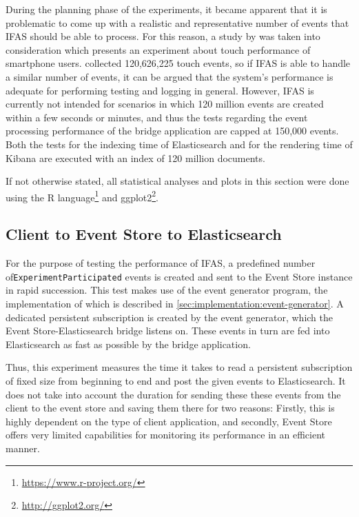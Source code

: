 During the planning phase of the experiments, it became apparent that it is problematic to come up with a realistic and representative number of events that \ac{IFAS} should be able to process.
For this reason, a study by \citet{Henze2011} was taken into consideration which presents an experiment about touch performance of smartphone users.
\citeauthor{Henze2011} collected 120,626,225 touch events, so if \ac{IFAS} is able to handle a similar number of events, it can be argued that the system's performance is adequate for performing testing and logging in general.
However, \ac{IFAS} is currently not intended for scenarios in which 120 million events are created within a few seconds or minutes, and thus the tests regarding the event processing performance of the bridge application are capped at 150,000 events.
Both the tests for the indexing time of Elasticsearch and for the rendering time of Kibana are executed with an index of 120 million documents.

If not otherwise stated, all statistical analyses and plots in this section were done using the R language\footnote{\url{https://www.r-project.org/}} and ggplot2\footnote{\url{http://ggplot2.org/}}.

\subsection{Client to Event Store to Elasticsearch}
\label{subsec:evaluation:performance:evt-es-bridge}

For the purpose of testing the performance of \ac{IFAS}, a predefined number of\linebreak \texttt{ExperimentParticipated} events is created and sent to the Event Store instance in rapid succession.
This test makes use of the event generator program, the implementation of which is described in \cref{sec:implementation:event-generator}.
A dedicated persistent subscription is created by the event generator, which the Event Store-Elasticsearch bridge listens on.
These events in turn are fed into Elasticsearch as fast as possible by the bridge application.

Thus, this experiment measures the time it takes to read a persistent subscription of fixed size from beginning to end and post the given events to Elasticsearch.
It does not take into account the duration for sending these these events from the client to the event store and saving them there for two reasons:
Firstly, this is highly dependent on the type of client application, and secondly, Event Store offers very limited capabilities for monitoring its performance in an efficient manner.

